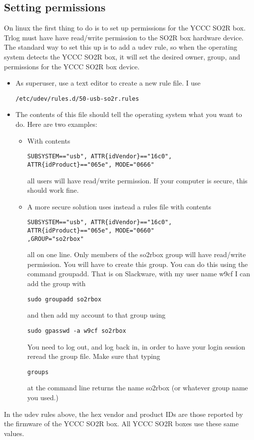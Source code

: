 \documentclass[12pt]{article}
\begin{document}
\subsection{Setting permissions}
On linux the first thing to do is to set up permissions for the YCCC SO2R box.
Trlog must have
have read/write permission to the SO2R box hardware
device.
The standard way to set this up is to add a udev rule,
so when the operating
system detects the YCCC SO2R box, it will set the desired owner, group,
and permissions for the YCCC SO2R box device.
\begin{itemize}
\item
As superuser, use a text editor to create a new rule file. I use
\begin{verbatim}
/etc/udev/rules.d/50-usb-so2r.rules
\end{verbatim}
\item
The contents of this file should tell the operating system what you want
to do. Here are two examples:
\begin{itemize}
\item
With contents
\begin{verbatim}
SUBSYSTEM=="usb", ATTR{idVendor}=="16c0", ATTR{idProduct}=="065e", MODE="0666"
\end{verbatim}
all users will have read/write permission. If your computer is secure,
this should work fine.
\item

A more secure solution uses instead a rules file
with contents
\begin{verbatim}
SUBSYSTEM=="usb", ATTR{idVendor}=="16c0", ATTR{idProduct}=="065e", MODE="0660"
,GROUP="so2rbox"
\end{verbatim}
all on one line.
Only members of the so2rbox group will have read/write permission.
You will have to create this group. You can do this
using the command groupadd.
That is on Slackware, with my
user name w9cf I can add the group with
\begin{verbatim}
sudo groupadd so2rbox
\end{verbatim}
and then add my account to that group using
\begin{verbatim}
sudo gpasswd -a w9cf so2rbox
\end{verbatim}
You need to log out, and log back in, in order to have your login session
reread the group file. Make sure that typing
\begin{verbatim}
groups
\end{verbatim}
at the command line returns the name so2rbox (or whatever group name you
used.)
\end{itemize}
\end{itemize}
In the udev rules above,
the hex vendor and product IDs are those reported by the
firmware of the YCCC SO2R box. All YCCC SO2R boxes use these same values.
\end{document}
